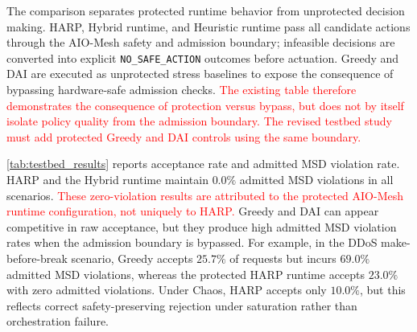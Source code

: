 \documentclass[final,5p]{elsarticle}
\newcommand{\rev}[1]{\textcolor{red}{#1}}
\begin{document}
The comparison separates protected runtime behavior from unprotected decision making. HARP, Hybrid runtime, and Heuristic runtime pass all candidate actions through the AIO-Mesh safety and admission boundary; infeasible decisions are converted into explicit \texttt{NO\_SAFE\_ACTION} outcomes before actuation. Greedy and DAI are executed as unprotected stress baselines to expose the consequence of bypassing hardware-safe admission checks. \rev{The existing table therefore demonstrates the consequence of protection versus bypass, but does not by itself isolate policy quality from the admission boundary. The revised testbed study must add protected Greedy and DAI controls using the same boundary.}

\autoref{tab:testbed_results} reports acceptance rate and admitted MSD violation rate. HARP and the Hybrid runtime maintain \(0.0\%\) admitted MSD violations in all scenarios. \rev{These zero-violation results are attributed to the protected AIO-Mesh runtime configuration, not uniquely to HARP.} Greedy and DAI can appear competitive in raw acceptance, but they produce high admitted MSD violation rates when the admission boundary is bypassed. For example, in the DDoS make-before-break scenario, Greedy accepts \(25.7\%\) of requests but incurs \(69.0\%\) admitted MSD violations, whereas the protected HARP runtime accepts \(23.0\%\) with zero admitted violations. Under Chaos, HARP accepts only \(10.0\%\), but this reflects correct safety-preserving rejection under saturation rather than orchestration failure.
\end{document}
